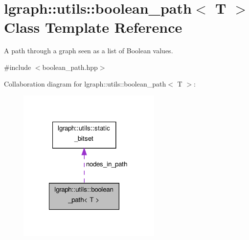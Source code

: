 \hypertarget{classlgraph_1_1utils_1_1boolean__path}{\section{lgraph\-:\-:utils\-:\-:boolean\-\_\-path$<$ T $>$ Class Template Reference}
\label{classlgraph_1_1utils_1_1boolean__path}
}


A path through a graph seen as a list of Boolean values.  




{\ttfamily \#include $<$boolean\-\_\-path.\-hpp$>$}



Collaboration diagram for lgraph\-:\-:utils\-:\-:boolean\-\_\-path$<$ T $>$\-:\nopagebreak
\begin{figure}[H]
\begin{center}
\leavevmode
\includegraphics[width=200pt]{classlgraph_1_1utils_1_1boolean__path__coll__graph}
\end{center}
\end{figure}
